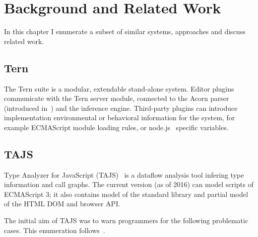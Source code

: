 \chapter{Background and Related Work}
\label{chap:background-and-related-work}

In this chapter I enumerate a subset of similar systems, approaches and discuss related work.

\section{Tern}

The Tern suite is a modular, extendable stand-alone system. Editor plugins communicate with the Tern server module, connected to the Acorn parser (introduced in~) and the inference engine. Third-party plugins can introduce implementation environmental or behavioral information for the system, for example ECMAScript module loading rules, or node.js~\cite{nodejs} specific variables.~\cite{tern-docs}


\section{TAJS}
Type Analyzer for JavaScript (TAJS)~\cite{tajs} is a dataflow analysis tool infering type information and call graphs. The current version (as of 2016) can model scripts of ECMAScript 3; it also contains model of the standard library and partial model of the HTML DOM and browser API.~\cite{tajs-git}

The initial aim of TAJS was to warn programmers for the following problematic cases. This enumeration follows~\cite{jensen_type_2009}.

